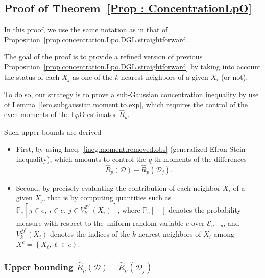 \documentclass[twoside,11pt]{article}
\numberwithin{equation}{section}
\newcommand{\1}{\mathds{1}}%
\newcommand{\paren}[1]{\left( #1 \right)}
\newcommand{\croch}[1]{\left[\, #1 \,\right]}
\newcommand{\acc}[1]{\left\{ #1 \right\}}
\renewcommand{\P}{\mathbb{P}}
\newcommand{\Rh}{\widehat{R}}
\newcommand{\Rhp}{\Rh_p}
\newcommand{\D}{\mathcal{D}}
\newcommand{\Enp}{\mathcal{E}_{n-p}}
\numberwithin{equation}{section}
\theoremstyle{plain}
\begin{document}
\subsection{Proof of Theorem~\ref{Prop : ConcentrationLpO}}
\label{Appendix:ConcentrationLpO}
%
In this proof, we use the same notation as in that of Proposition~\ref{prop.concentration.Lpo.DGL.straightforward}.

The goal of the proof is to provide a refined version of previous Proposition~\ref{prop.concentration.Lpo.DGL.straightforward} by taking into account the
status of each $X_j$ as one of the $k$ nearest neighbors of a given $X_i$ (or not).


To do so, our strategy is to prove a sub-Gaussian concentration inequality by use of Lemma~\ref{lem.subgaussian.moment.to.exp}, which requires the control of the even moments of the L$p$O estimator $\Rhp$.

Such upper bounds are derived
\begin{itemize}
	\item First, by using Ineq.~\eqref{ineg.moment.removed.obs} (generalized Efron-Stein inequality), which amounts to control the $q$-th moments of the differences
$$\Rh_p( \D )- \Rhp\paren{\D_j} .$$

	\item Second, by precisely evaluating the contribution of each neighbor $X_i$ of a given $X_j$, that is by computing quantities such as $\P_e\croch{j\in e,\ i\in \bar e,\ j \in V_k^{\D^e}(X_i)  }$, where $\P_e\croch{\cdot}$ denotes the probability measure with respect to the uniform random variable $e$ over $\Enp$, and $V_k^{\D^e}(X_i)$ denotes the indices of the $k$ nearest neighbors of $X_i$ among $X^e = \acc{X_{\ell}, \ell\in e}$.

\end{itemize}

\subsubsection{Upper bounding $\Rh_p( \D )- \Rhp\paren{\D_j}$}
\end{document}
